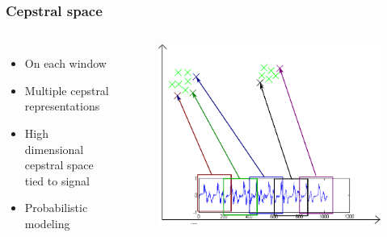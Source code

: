 \documentclass[11pt,english]{beamer}
\begin{document}
\begin{frame}
  \frametitle{Cepstral space}
  \begin{columns}
    \begin{itemize}
    \item On each window
    \item Multiple cepstral representations
    \item High dimensional cepstral space tied to signal
    \item Probabilistic modeling
    \end{itemize}
      \begin{figure}
        \centering
       \includegraphics[scale = 0.5]{cepstral_space.pdf}
      \end{figure}
  \end{columns}
\end{frame}
\end{document}
